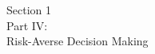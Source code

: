 \documentclass[aspectratio=169,xcolor=dvipsnames,10pt]{beamer}
\newcommand{\cJ}{\mathcal{J}}
\newcommand{\cZ}{\mathcal{Z}}
\newcommand{\risk}{\mathcal{R}}
\begin{document}

\begin{frame}\frametitle{}
\begin{center}\Large
Section 1\\
Part IV:\\
Risk-Averse Decision Making 
\end{center}
\end{frame}
\end{document}
